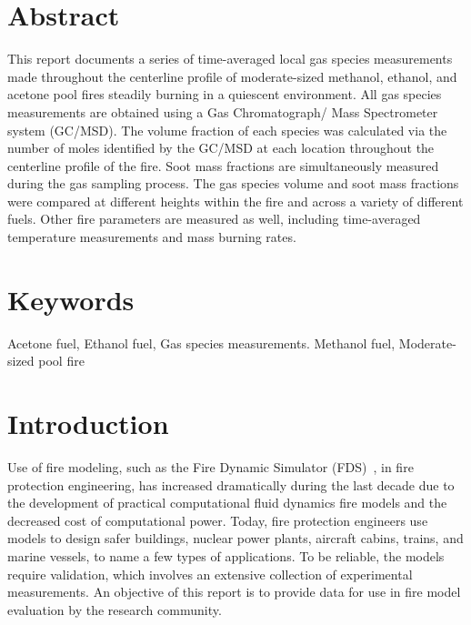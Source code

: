 \documentclass[12pt]{article}
\begin{document}
\section*{Abstract}
This report documents a series of time-averaged local gas species measurements made throughout the centerline profile of moderate-sized methanol, ethanol, and acetone pool fires steadily burning in a quiescent environment. All gas species measurements are obtained using a Gas Chromatograph/ Mass Spectrometer system (GC/MSD). The volume fraction of each species was calculated via the number of moles identified by the GC/MSD at each location throughout the centerline profile of the fire. Soot mass fractions are simultaneously measured during the gas sampling process. The gas species volume and soot mass fractions were compared at different heights within the fire and across a variety of different fuels. Other fire parameters are measured as well, including time-averaged temperature measurements and mass burning rates. 
\section*{Keywords}
\normalsize Acetone fuel, Ethanol fuel, Gas species measurements. Methanol fuel, Moderate-sized pool fire\\
\pagebreak
\begin{center}
	\tableofcontents
	\listoftables
	\listoffigures
\end{center}
\pagebreak
\section{Introduction}
\label{sec:intro}
Use of fire modeling, such as the Fire Dynamic Simulator (FDS)~\cite{FDS_Tech_Guide}, in fire protection engineering, has increased dramatically during the last decade due to the development of practical computational fluid dynamics fire models and the decreased cost of computational power. Today, fire protection engineers use models to design safer buildings, nuclear power plants, aircraft cabins, trains, and marine vessels, to name a few types of applications. To be reliable, the models require validation, which involves an extensive collection of experimental measurements. An objective of this report is to provide data for use in fire model evaluation by the research community.
\end{document}
